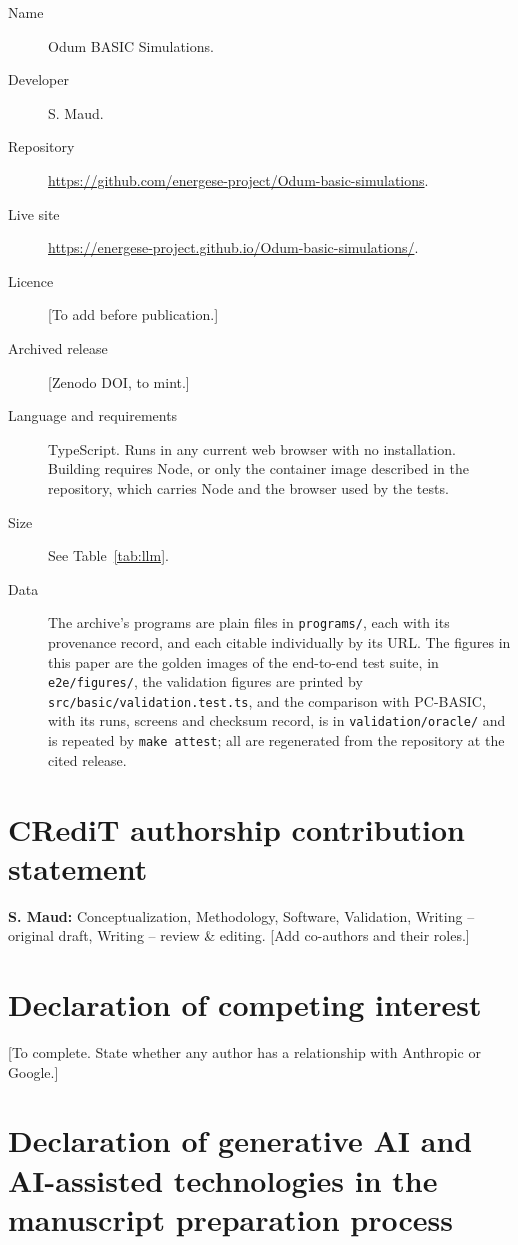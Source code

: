\begin{description}
\item[Name] Odum BASIC Simulations.
\item[Developer] S. Maud.
\item[Repository] \url{https://github.com/energese-project/Odum-basic-simulations}.
\item[Live site] \url{https://energese-project.github.io/Odum-basic-simulations/}.
\item[Licence] [To add before publication.]
\item[Archived release] [Zenodo DOI, to mint.]
\item[Language and requirements] TypeScript. Runs in any current web browser with no installation. Building requires Node, or only the container image described in the repository, which carries Node and the browser used by the tests.
\item[Size] See Table~\ref{tab:llm}.
\item[Data] The archive's programs are plain files in \texttt{programs/}, each with its provenance record, and each citable individually by its URL. The figures in this paper are the golden images of the end-to-end test suite, in \texttt{e2e/figures/}, the validation figures are printed by \texttt{src/basic/validation.test.ts}, and the comparison with PC-BASIC, with its runs, screens and checksum record, is in \texttt{validation/oracle/} and is repeated by \texttt{make attest}; all are regenerated from the repository at the cited release.
\end{description}

\section*{CRediT authorship contribution statement}
\textbf{S. Maud:} Conceptualization, Methodology, Software, Validation, Writing -- original draft, Writing -- review \& editing. [Add co-authors and their roles.]

\section*{Declaration of competing interest}
[To complete. State whether any author has a relationship with Anthropic or Google.]

\section*{Declaration of generative AI and AI-assisted technologies in the manuscript preparation process}

